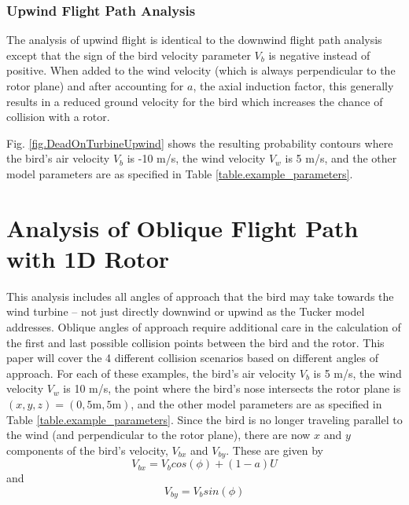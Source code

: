 \label{} \documentclass[10pt,conference]{IEEEtran}
\begin{document}
\subsubsection{Upwind Flight Path Analysis}
The analysis of upwind flight is identical to the downwind flight path analysis except that the sign of the bird
velocity parameter $V_b$ is negative instead of positive. When added to the wind velocity (which is always
perpendicular to the rotor plane) and after accounting for $a$, the axial induction factor, this generally results in a
reduced ground velocity for the bird which increases the chance of collision with a rotor.

Fig. \ref{fig.DeadOnTurbineUpwind} shows the resulting probability contours where the bird's air velocity $V_b$ is -10
m/s, the wind velocity $V_w$ is 5 m/s, and the other model parameters are as specified in Table
\ref{table.example_parameters}.

\section{Analysis of Oblique Flight Path with 1D Rotor}
This analysis includes all angles of approach that the bird may take towards the wind turbine -- not just directly
downwind or upwind as the Tucker model addresses. Oblique angles of approach require additional care in the calculation
of the first and last possible collision points between the bird and the rotor. This paper will cover the 4 different
collision scenarios based on different angles of approach. For each of these examples, the bird's air velocity $V_b$ is
5 m/s, the wind velocity $V_w$ is 10 m/s, the point where the bird's nose intersects the rotor plane is $(x,y,z) =
(0,5\text{m},5\text{m})$, and the other model parameters are as specified in Table \ref{table.example_parameters}.
Since the bird is no longer traveling parallel to the wind (and perpendicular to the rotor plane), there are now $x$
and $y$ components of the bird's velocity, $V_{bx}$ and $V_{by}$. These are given by
\begin{equation*}
    V_{bx} = V_b cos(\phi)+(1-a)U
\end{equation*}
and
\begin{equation*}
    V_{by} = V_b sin(\phi)
\end{equation*}
\end{document}
